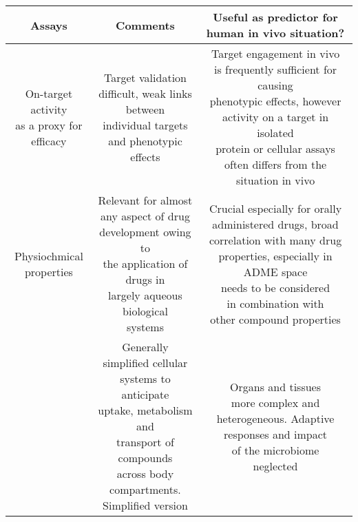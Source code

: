 	\begin{table}[H]
		\centering
		\begin{tabular}{|c|c|c|}
			\hline
			Assays & Comments & Useful as predictor for human in vivo situation?\\
			\hline
			\makecell{On-target activity \\as a proxy for\\efficacy} & \makecell{Target validation \\difficult, weak links between\\individual targets\\ and phenotypic effects} & \makecell{Target engagement in vivo\\ is frequently sufficient for causing\\phenotypic effects, however\\ activity on a target in isolated\\protein or cellular assays\\ often differs from the situation in vivo}\\
			\hline
			\makecell{Physiochmical\\properties} & \makecell{Relevant for almost\\any aspect of drug\\development owing to\\the application of drugs in\\largely aqueous biological\\systems} & \makecell{Crucial especially for orally\\administered drugs, broad\\correlation with many drug\\properties, especially in ADME space\\needs to be considered\\in combination with\\other compound properties}\\
			\hline
			\makecell{PK and points} & \makecell{Generally simplified cellular\\systems to anticipate\\uptake, metabolism and\\transport of compounds\\across body compartments.\\Simplified version} & \makecell{Organs and tissues\\more complex and\\heterogeneous. Adaptive\\responses and impact\\of the microbiome\\neglected}\\

\end{tabular}
\end{table}
